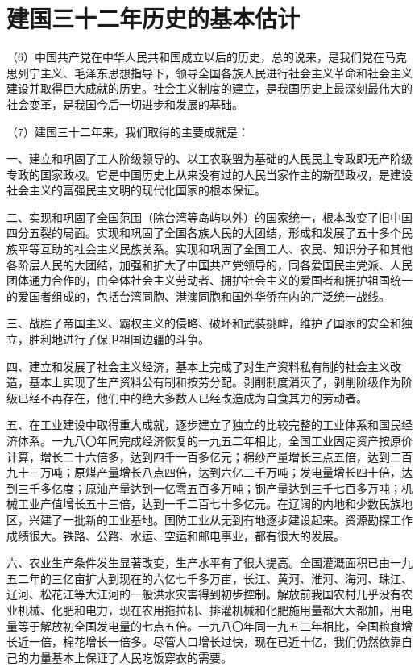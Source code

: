 \section{建国三十二年历史的基本估计}

（6）中国共产党在中华人民共和国成立以后的历史，总的说来，是我们党在马克思列宁主义、毛泽东思想指导下，领导全国各族人民进行社会主义革命和社会主义建设并取得巨大成就的历史。社会主义制度的建立，是我国历史上最深刻最伟大的社会变革，是我国今后一切进步和发展的基础。

（7）建国三十二年来，我们取得的主要成就是：

一、建立和巩固了工人阶级领导的、以工农联盟为基础的人民民主专政即无产阶级专政的国家政权。它是中国历史上从来没有过的人民当家作主的新型政权，是建设社会主义的富强民主文明的现代化国家的根本保证。

二、实现和巩固了全国范围（除台湾等岛屿以外）的国家统一，根本改变了旧中国四分五裂的局面。实现和巩固了全国各族人民的大团结，形成和发展了五十多个民族平等互助的社会主义民族关系。实现和巩固了全国工人、农民、知识分子和其他各阶层人民的大团结，加强和扩大了中国共产党领导的，同各爱国民主党派、人民团体通力合作的，由全体社会主义劳动者、拥护社会主义的爱国者和拥护祖国统一的爱国者组成的，包括台湾同胞、港澳同胞和国外华侨在内的广泛统一战线。

三、战胜了帝国主义、霸权主义的侵略、破坏和武装挑衅，维护了国家的安全和独立，胜利地进行了保卫祖国边疆的斗争。

四、建立和发展了社会主义经济，基本上完成了对生产资料私有制的社会主义改造，基本上实现了生产资料公有制和按劳分配。剥削制度消灭了，剥削阶级作为阶级已经不再存在，他们中的绝大多数人已经改造成为自食其力的劳动者。

五、在工业建设中取得重大成就，逐步建立了独立的比较完整的工业体系和国民经济体系。一九八〇年同完成经济恢复的一九五二年相比，全国工业固定资产按原价计算，增长二十六倍多，达到四千一百多亿元；棉纱产量增长三点五倍，达到二百九十三万吨；原煤产量增长八点四倍，达到六亿二千万吨；发电量增长四十倍，达到三千多亿度；原油产量达到一亿零五百多万吨；钢产量达到三千七百多万吨；机械工业产值增长五十三倍，达到一千二百七十多亿元。在辽阔的内地和少数民族地区，兴建了一批新的工业基地。国防工业从无到有地逐步建设起来。资源勘探工作成绩很大。铁路、公路、水运、空运和邮电事业，都有很大的发展。

六、农业生产条件发生显著改变，生产水平有了很大提高。全国灌溉面积已由一九五二年的三亿亩扩大到现在的六亿七千多万亩，长江、黄河、淮河、海河、珠江、辽河、松花江等大江河的一般洪水灾害得到初步控制。解放前我国农村几乎没有农业机械、化肥和电力，现在农用拖拉机、排灌机械和化肥施用量都大大都加，用电量等于解放初全国发电量的七点五倍。一九八〇年同一九五二年相比，全国粮食增长近一倍，棉花增长一倍多。尽管人口增长过快，现在已近十亿，我们仍然依靠自己的力量基本上保证了人民吃饭穿衣的需要。

